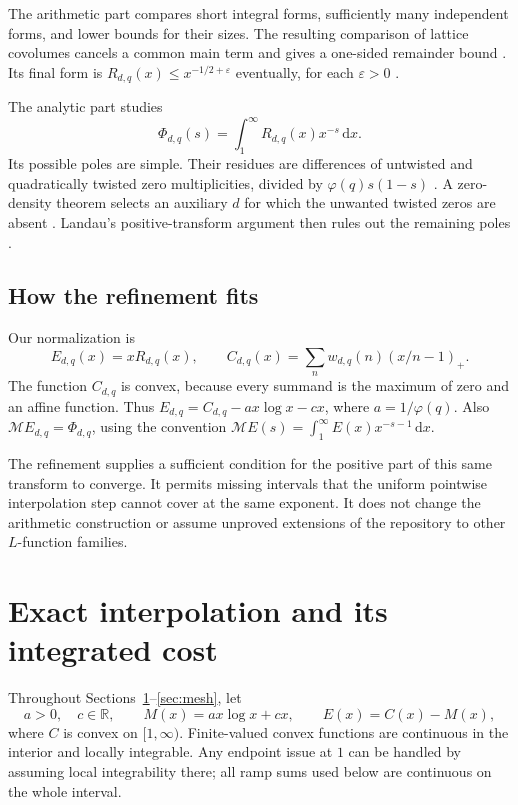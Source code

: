 \documentclass[11pt]{article}
\theoremstyle{definition}
\newcommand{\R}{\mathbb R}
\newcommand{\ep}{\varepsilon}
\newcommand{\Mell}{\mathcal M}
\newcommand{\dd}{\,\mathrm d}
\begin{document}
The arithmetic part compares short integral forms, sufficiently many
independent forms, and lower bounds for their sizes. The resulting
comparison of lattice covolumes cancels a common main term and gives a
one-sided remainder bound \cite{guide,mainineq}. Its final form is
\(R_{d,q}(x)\leq x^{-1/2+\ep}\) eventually, for each \(\ep>0\)
\cite{onesided}.

The analytic part studies
\begin{equation}\label{eq:repo-transform}
 \Phi_{d,q}(s)=\int_1^\infty R_{d,q}(x)x^{-s}\dd x.
\end{equation}
Its possible poles are simple. Their residues are differences of
untwisted and quadratically twisted zero multiplicities, divided by
\(\varphi(q)s(1-s)\) \cite{primeerror}. A zero-density theorem selects an
auxiliary \(d\) for which the unwanted twisted zeros are absent
\cite{twist}. Landau's positive-transform argument then rules out the
remaining poles \cite{landau,criterion}.

\subsection{How the refinement fits}

Our normalization is
\begin{equation}\label{eq:normalization}
 E_{d,q}(x)=xR_{d,q}(x),\qquad
 C_{d,q}(x)=\sum_nw_{d,q}(n)(x/n-1)_+.
\end{equation}
The function \(C_{d,q}\) is convex, because every summand is the maximum
of zero and an affine function. Thus
\(E_{d,q}=C_{d,q}-ax\log x-cx\), where \(a=1/\varphi(q)\).
Also \(\Mell E_{d,q}=\Phi_{d,q}\), using the convention
\(\Mell E(s)=\int_1^\infty E(x)x^{-s-1}\dd x\).

The refinement supplies a sufficient condition for the positive part of
this same transform to converge. It permits missing intervals that the
uniform pointwise interpolation step cannot cover at the same exponent.
It does not change the arithmetic construction or assume unproved
extensions of the repository to other \(L\)-function families.

\section{Exact interpolation and its integrated cost}
\label{sec:interpolation}

Throughout Sections~\ref{sec:interpolation}--\ref{sec:mesh}, let
\begin{equation}\label{eq:general-E}
 a>0,\quad c\in\R,\qquad M(x)=ax\log x+cx,
 \qquad E(x)=C(x)-M(x),
\end{equation}
where \(C\) is convex on \([1,\infty)\). Finite-valued convex functions
are continuous in the interior and locally integrable. Any endpoint issue
at \(1\) can be handled by assuming local integrability there; all ramp
sums used below are continuous on the whole interval.
\end{document}
